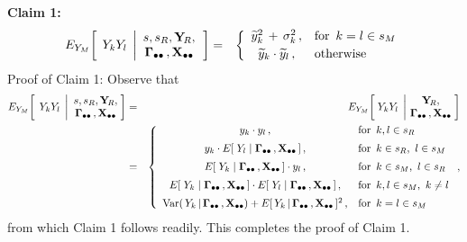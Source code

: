 \begin{enumerate}
    \vskip 0.5cm
    \textbf{Claim 1:}\quad
    \begin{eqnarray*}
    E_{Y_{M}}\!\left[\;\,
        Y_{k}Y_{l}
        \;\left\vert
        \begin{array}{c}
            s,s_{R},\YsubR, \\ \Gdotdot\,,\Xobs
            \end{array}
        \right.
        \right]
    & = &
        \left\{\begin{array}{cl}
            \widetilde{y}_{k}^{2} \,+\, \sigma_{k}^{2}\,, & \textnormal{for \,$k = l \in s_{M}$}
            \\
            \widetilde{y}_{k} \cdot \widetilde{y}_{l}\,, & \overset{{\color{white}.}}{\textnormal{otherwise}}
            \end{array}\right.
    \end{eqnarray*}
    Proof of Claim 1:\;\; Observe that
    \begin{eqnarray*}
        E_{Y_{M}}\!\left[\;\,
        Y_{k}Y_{l}
        \;\left\vert
        \begin{array}{c}
            s,s_{R},\YsubR, \\ \Gdotdot\,,\Xobs
            \end{array}
        \right.
        \!\!\right]
    & = &
        E_{Y_{M}}\!\left[\;
            Y_{k}Y_{l}
            \;\left\vert\!
            \begin{array}{c}
                \YsubR,
                \\
                \Gdotdot\,,\Xobs
                \end{array}
                \right.
            \!\!\right]
    \\
    & = &
        \left\{\begin{array}{cl}
            y_{k} \cdot y_{l}\,, & \underset{{\color{white}.}}{\textnormal{for \,$k,l \in s_{R}$}}
            \\
            y_{k} \cdot E[\;Y_{l}\;\vert\;\Gdotdot\,,\Xobs\,]\,, & \underset{{\color{white}.}}{\textnormal{for \,$k \in s_{R}$,\, $l \in s_{M}$}}
            \\
            E[\;Y_{k}\;\vert\;\Gdotdot\,,\Xobs\,] \cdot y_{l}\,, & \underset{{\color{white}.}}{\textnormal{for \,$k \in s_{M}$,\, $l \in s_{R}$}}
            \\
            E[\;Y_{k}\;\vert\;\Gdotdot\,,\Xobs\,] \cdot E[\;Y_{l}\;\vert\;\Gdotdot\,,\Xobs\,]\,, & \underset{{\color{white}.}}{\textnormal{for \,$k,l \in s_{M}$,\, $k \neq l$}}
            \\
            \Var(\,Y_{k}\,\vert\,\Gdotdot\,,\Xobs) + E[\,Y_{k}\,\vert\,\Gdotdot\,,\Xobs\,]^{2}\,, & \textnormal{for \,$k = l \in s_{M}$}
            \end{array}\right.,
    \end{eqnarray*}
    from which Claim 1 follows readily.
    This completes the proof of Claim 1.


\end{enumerate}
